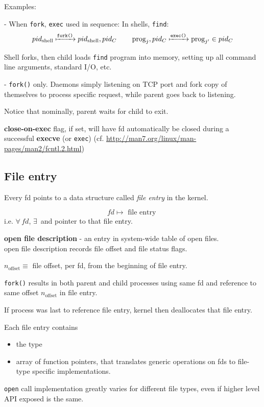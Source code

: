 \documentclass[10pt]{amsart}
\begin{document}
Examples:

- When \texttt{fork}, \texttt{exec} used in sequence: 
In shells, \texttt{find}: 
\[
pid_{\text{shell}} \xmapsto{\texttt{fork()}} pid_{\text{shell}}, pid_C \qquad \, \text{prog}_j, pid_C \xmapsto{\texttt{exec()}} \text{prog}_{j'} \in pid_C
\] 

Shell forks, then child loads \texttt{find} program into memory, setting up all command line arguments, standard I/O, etc.

- \texttt{fork()} only.
Daemons simply listening on TCP port and fork copy of themselves to process specific request, while parent goes back to listening. 

Notice that nominally, parent waits for child to exit. 

\textbf{close-on-exec} flag, if set, will have fd automatically be closed during a successful \textbf{execve} (or \texttt{exec}) (cf. \url{http://man7.org/linux/man-pages/man2/fcntl.2.html})

\subsection{File entry}

Every fd points to a data structure called \emph{file entry} in the kernel.

\[
fd \mapsto \text{ file entry }
\]
i.e. $\forall \, fd$, $\exists \,$  and pointer to that file entry.


\textbf{open file description} - an entry in system-wide table of open files. \\
open file description records file offset and file status flags.

$n_{\text{offset}} \equiv $ file offset, per fd, from the beginning of file entry.

\texttt{fork()} results in both parent and child processes using same fd and reference to same offset $n_{\text{offset}}$ in file entry.

If process was last to reference file entry, kernel then deallocates that file entry.


Each file entry contains
\begin{itemize}
	\item the type
	\item array of function pointers, that translates generic operations on fds to file-type specific implementations.
\end{itemize}

\texttt{open} call implementation greatly varies for different file types, even if higher level API exposed is the same.
\end{document}
